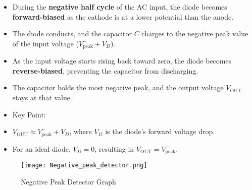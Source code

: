 \documentclass[9pt,conference]{IEEEtran}
\begin{document}
\begin{itemize}
    \item During the \textbf{negative half cycle} of the AC input, the diode becomes \textbf{forward-biased} as the cathode is at a lower potential than the anode.
    \item The diode conducts, and the capacitor \( C \) charges to the negative peak value of the input voltage (\( V_{\text{peak}}^{-} + V_D \)).
    \item As the input voltage starts rising back toward zero, the diode becomes \textbf{reverse-biased}, preventing the capacitor from discharging.
    \item The capacitor holds the most negative peak, and the output voltage \( V_{\text{OUT}} \) stays at that value.
    \item Key Point:
    \item \( V_{\text{OUT}} \approx V_{\text{peak}}^{-} + V_D \), where \( V_D \) is the diode's forward voltage drop.
    \item For an ideal diode, \( V_D = 0 \), resulting in \( V_{\text{OUT}} = V_{\text{peak}}^{-} \).
\end{itemize}

\begin{figure}[H]
    \centering
    \texttt{[image: Negative\_peak\_detector.png]}
    \caption{Negative Peak Detector Graph}
    \label{fig:positive_clamper}
\end{figure}
\end{document}
